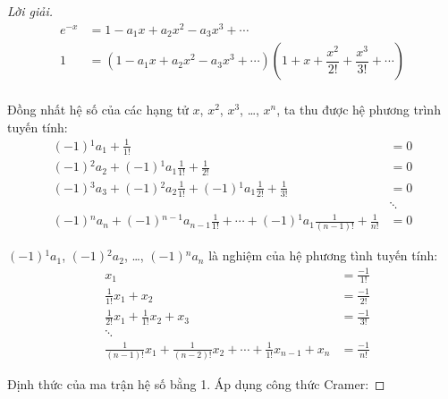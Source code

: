\documentclass[class=linear-algebra,crop=false]{standalone}
\begin{document}
\begin{proof}[Lời giải]
	\begingroup{}
	\allowdisplaybreaks{}
	\begin{align*}
		e^{-x} & = 1 - a_{1}x + a_{2}x^{2} - a_{3}x^{3} + \cdots                                                                      \\
		1      & = (1 - a_{1}x + a_{2}x^{2} - a_{3}x^{3} + \cdots)\left(1 + x + \dfrac{x^{2}}{2!} + \dfrac{x^{3}}{3!} + \cdots\right) \\
	\end{align*}
	\endgroup{}
	\par Đồng nhất hệ số của các hạng tử $x$, $x^{2}$, $x^{3}$, \ldots, $x^{n}$, ta thu được hệ phương trình tuyến tính:
	\begin{align*}
		(-1){}^{1}a_{1} + \frac{1}{1!}                                                                              & = 0    \\
		(-1){}^{2}a_{2} + (-1){}^{1}a_{1}\frac{1}{1!} + \frac{1}{2!}                                                & = 0    \\
		(-1){}^{3}a_{3} + (-1){}^{2}a_{2}\frac{1}{1!} + (-1){}^{1}a_{1}\frac{1}{2!} + \frac{1}{3!}                  & = 0    \\
		                                                                                                            & \ddots \\
		(-1){}^{n}a_{n} + (-1){}^{n-1}a_{n-1}\frac{1}{1!} + \cdots + (-1){}^{1}a_{1}\frac{1}{(n-1)!} + \frac{1}{n!} & = 0
	\end{align*}
	\par $(-1){}^{1}a_{1}$, $(-1){}^{2}a_{2}$, \ldots, $(-1){}^{n}a_{n}$ là nghiệm của hệ phương tình tuyến tính:
	\begin{align*}
		 & x_{1}                                                                                & = \frac{-1}{1!} \\
		 & \frac{1}{1!}x_{1} + x_{2}                                                            & = \frac{-1}{2!} \\
		 & \frac{1}{2!}x_{1} + \frac{1}{1!}x_{2} + x_{3}                                        & = \frac{-1}{3!} \\
		 & \ddots                                                                               &                 \\
		 & \frac{1}{(n-1)!}x_{1} + \frac{1}{(n-2)!}x_{2} + \cdots + \frac{1}{1!}x_{n-1} + x_{n} & = \frac{-1}{n!}
	\end{align*}
	\par Định thức của ma trận hệ số bằng 1. Áp dụng công thức Cramer:

\end{proof}
\end{document}
